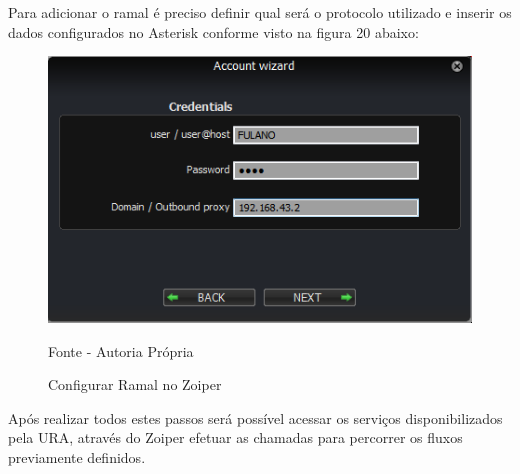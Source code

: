 Para adicionar o ramal é preciso definir qual será o protocolo utilizado e inserir os dados configurados no Asterisk conforme visto na figura 20 abaixo:

\begin{figure}[!htb]
	\centering
	\includegraphics{figuras/configurar_ramal_zoiper.png}
	\caption{Configurar Ramal no Zoiper}	
	Fonte - Autoria Própria
\end{figure}

Após realizar todos estes passos será possível acessar os serviços disponibilizados pela URA, através do Zoiper efetuar as chamadas para percorrer os fluxos previamente definidos.